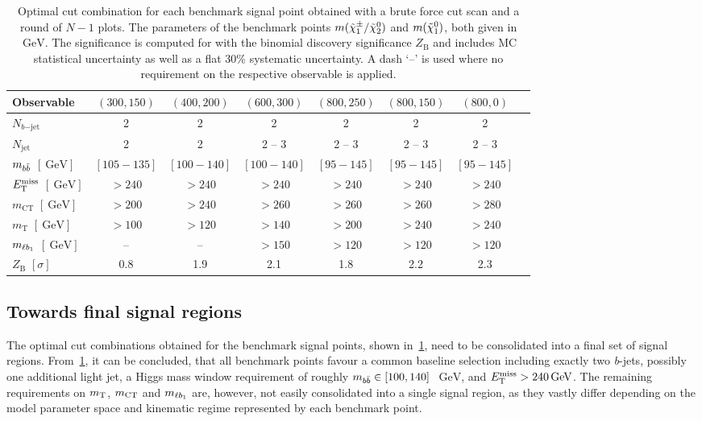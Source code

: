 \begin{table}
	\begin{center}
	\small
			\begin{tabular} {l c c c c c c c}
				\toprule
				Observable &  $(300,150)$ & $(400,200)$ & $(600,300)$  & $(800,250)$ & $(800,150)$ & $(800,0)$ \\
				\midrule
				$N_{b\mathrm{-jet}}$ &  2 & 2 & 2 & 2 & 2 & 2 \\
				$N_\mathrm{jet}$ & 2 & 2 & 2 -- 3 & 2 -- 3  & 2 -- 3 & 2 -- 3\\
				$m_{b\bar{b}}$  $[\SI{}{\GeV}]$& $[105-135]$ & $[100-140]$ & $[100-140]$ & $[95-145]$ & $[95-145]$ & $[95-145]$ \\
				$E_{\textrm{T}}^{\textrm{miss}}$ $[\SI{}{\GeV}]$ & $>240$ & $>240$ & $>240$ & $>240$ & $>240$  & $>240$\\
				$m_\mathrm{CT}$ $[\SI{}{\GeV}]$ &  $>200$ & $>240$ & $>260$ & $>260$ & $>260$   & $>280$ \\
				$m_\mathrm{T}$ $[\SI{}{\GeV}]$ &  $>100$ & $>120$ & $>140$ & $>200$ & $>240$ & $>240$ \\
				$m_{\ell b_{1}}$ $[\SI{}{\GeV}]$ &  -- & -- & $>150$ & $>120$ & $>120$ & $>120$ \\
				\midrule
				$Z_\mathrm{B}$ $[\sigma]$ & \multicolumn{1}{c}{0.8} & \multicolumn{1}{c}{1.9} & \multicolumn{1}{c}{2.1} & \multicolumn{1}{c}{1.8} & \multicolumn{1}{c}{2.2} & \multicolumn{1}{c}{2.3} \\
				\bottomrule
			\end{tabular}
		\caption{Optimal cut combination for each benchmark signal point obtained with a brute force cut scan and a round of $N-1$ plots. The parameters of the benchmark points $m(\tilde{\chi}_1^\pm/\tilde{\chi}_2^0)$ and $m(\tilde{\chi}_1^0)$, both given in $\SI{}{\GeV}$. The significance is computed for \onethirtynineifb with the binomial discovery significance $Z_\mathrm{B}$ and includes MC statistical uncertainty as well as a flat 30\% systematic uncertainty. A dash `--' is used where no requirement on the respective observable is applied.}
		\label{tab:cut_scan_results}
	\end{center}
\end{table}




\subsection{Towards final signal regions}\label{sec:towards_signal_regions}

The optimal cut combinations obtained for the benchmark signal points, shown in~\cref{tab:cut_scan_results}, need to be consolidated into a final set of signal regions.
From~\cref{tab:cut_scan_results}, it can be concluded, that all benchmark points favour a common baseline selection including exactly two \textit{b}-jets, possibly one additional light jet, a Higgs mass window requirement of roughly $m_{b\bar{b}}\in [100,140]$~$\SI{}{\GeV}$, and $\etmiss > \SI{240}{\GeV}$.
The remaining requirements on $m_{\textrm{T}}$, $m_{\textrm{CT}}$ and $m_{\ell b_{1}}$ are, however, not easily consolidated into a single signal region, as they vastly differ depending on the model parameter space and kinematic regime represented by each benchmark point.

